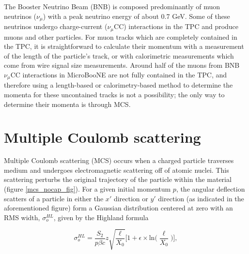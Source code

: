 \documentclass[a4paper,11pt]{article}
\begin{document}
The Booster Neutrino Beam (BNB) is composed predominantly of muon neutrinos ($\nu_\mu$) with a peak neutrino energy of about 0.7 GeV. Some of these neutrinos undergo charge-current ($\nu_\mu$CC) interactions in the TPC and produce muons and other particles. For muon tracks which are completely contained in the TPC, it is straightforward to calculate their momentum with a measurement of the length of the particle's track, or with calorimetric measurements which come from wire signal size measurements. Around half of the muons from BNB $\nu_\mu$CC interactions in MicroBooNE are not fully contained in the TPC, and therefore using a length-based or calorimetry-based method to determine the momenta for these uncontained tracks is not a possibility; the only way to determine their momenta is through MCS. \\

\section{Multiple Coulomb scattering}

Multiple Coulomb scattering (MCS) occurs when a charged particle traverses medium and undergoes electromagnetic scattering off of atomic nuclei. This scattering perturbs the original trajectory of the particle within the material (figure \ref{mcs_nocap_fig}). For a given initial momentum $p$, the angular deflection scatters of a particle in either the $x'$ direction or $y'$ direction (as indicated in the aforementioned figure) form a Gaussian distribution centered at zero with an RMS width, $\sigma_o^{HL}$, given by the Highland formula \cite{highland}\cite{highland-lynch-dahl} 

\begin{equation}\label{highland_eqtn}
	\sigma_o^{HL}=\frac{S_2}{p\beta c}z\sqrt{\frac{\ell}{X_0}}\Big[1+\epsilon\times\text{ln}\Big(\frac{\ell}{X_0}\Big)\Big],
\end{equation}
\end{document}
